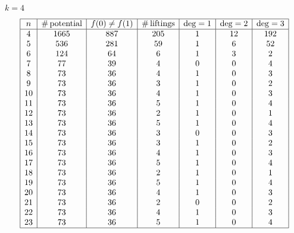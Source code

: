 \documentclass[11pt,english,a4paper]{amsart}
\theoremstyle{plain}
\theoremstyle{definition}
\theoremstyle{remark}
\begin{document}
    $k=4$
	\[
	\begin{array}{|c|c|c|c|c|c|c|} \hline
		n & \#\,\text{potential} & f(0) \neq f(1) & \#\,\text{liftings} & \deg = 1 & \deg = 2 & \deg = 3 \\ \hline
		4 & 1665 & 887 & 205 & 1 & 12 & 192 \\
		5 & 536 & 281 & 59 & 1 & 6 & 52 \\
		6 & 124 & 64 & 6 & 1 & 3 & 2 \\
		7 & 77 & 39 & 4 & 0 & 0 & 4 \\
		8 & 73 & 36 & 4 & 1 & 0 & 3 \\
		9 & 73 & 36 & 3 & 1 & 0 & 2 \\
		10 & 73 & 36 & 4 & 1 & 0 & 3 \\
		11 & 73 & 36 & 5 & 1 & 0 & 4 \\
		12 & 73 & 36 & 2 & 1 & 0 & 1 \\
		13 & 73 & 36 & 5 & 1 & 0 & 4 \\
		14 & 73 & 36 & 3 & 0 & 0 & 3 \\
		15 & 73 & 36 & 3 & 1 & 0 & 2 \\
		16 & 73 & 36 & 4 & 1 & 0 & 3 \\
		17 & 73 & 36 & 5 & 1 & 0 & 4 \\
		18 & 73 & 36 & 2 & 1 & 0 & 1 \\
		19 & 73 & 36 & 5 & 1 & 0 & 4 \\
		20 & 73 & 36 & 4 & 1 & 0 & 3 \\
		21 & 73 & 36 & 2 & 0 & 0 & 2 \\
		22 & 73 & 36 & 4 & 1 & 0 & 3 \\
		23 & 73 & 36 & 5 & 1 & 0 & 4 \\ \hline
	\end{array}
	\]
\end{document}
